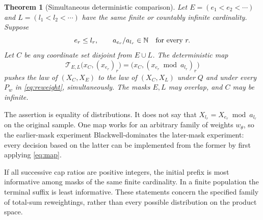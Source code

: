 \documentclass[11pt,a4paper]{article}
\newtheorem{theorem}{Theorem}[section]\newtheorem{lemma}[theorem]{Lemma}
\theoremstyle{remark}\newtheorem*{ednote}{Editorial note (ProveIt, 2026-10-01)}
\begin{document}
\begin{theorem}[Simultaneous deterministic comparison]\label{thm:masks}
Let $E=(e_1<e_2<\cdots)$ and $L=(l_1<l_2<\cdots)$ have the same finite or countably infinite cardinality. Suppose
\[
 e_r\le l_r,\qquad a_{e_r}/a_{l_r}\in\mathbb N
 \quad\text{for every }r.
\]
Let $C$ be any coordinate set disjoint from $E\cup L$. The deterministic map
\begin{equation}\label{eq:map}
 \mathcal T_{E,L}\bigl(x_C,(x_{e_r})_r\bigr)
       =\bigl(x_C,(x_{e_r}\bmod a_{l_r})_r\bigr)
\end{equation}
pushes the law of $(X_C,X_E)$ to the law of $(X_C,X_L)$ under $Q$ and under every $P_w$ in \eqref{eq:reweight}, simultaneously. The masks $E,L$ may overlap, and $C$ may be infinite.
\end{theorem}
The assertion is equality of distributions. It does not say that $X_{l_r}=X_{e_r}\bmod a_{l_r}$ on the original sample. One map works for an arbitrary family of weights $w_\theta$, so the earlier-mask experiment Blackwell-dominates the later-mask experiment: every decision based on the latter can be implemented from the former by first applying \eqref{eq:map}.

If all successive cap ratios are positive integers, the initial prefix is most informative among masks of the same finite cardinality. In a finite population the terminal suffix is least informative. These statements concern the specified family of total-sum reweightings, rather than every possible distribution on the product space.
\end{document}
